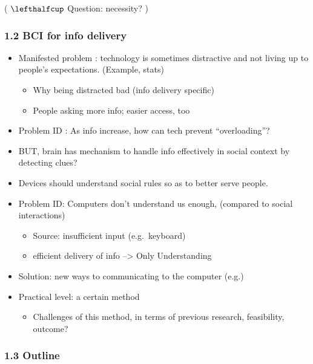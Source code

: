 \documentclass[11pt]{article}
\begin{document}
( $\lefthalfcup$ Question: necessity? )

\subsubsection{1.2 BCI for info delivery}\label{bci-for-info-delivery}

\begin{itemize}
\itemsep1pt\parskip0pt
\item
  Manifested problem : technology is sometimes distractive and not
  living up to people's expectations. (Example, stats)

  \begin{itemize}
  \itemsep1pt\parskip0pt
  \item
    Why being distracted bad (info delivery specific)
  \item
    People asking more info; easier access, too
  \end{itemize}
\item
  Problem ID : As info increase, how can tech prevent ``overloading''?
\item
  BUT, brain has mechanism to handle info effectively in social context
  by detecting clues?
\item
  Devices should understand social rules so as to better serve people.
\item
  Problem ID: Computers don't understand us enough, (compared to social
  interactions)

  \begin{itemize}
  \itemsep1pt\parskip0pt
  \item
    Source: insufficient input (e.g.~keyboard)
  \item
    efficient delivery of info --\textgreater{} Only Understanding
  \end{itemize}
\item
  Solution: new ways to communicating to the computer (e.g.)
\item
  Practical level: a certain method

  \begin{itemize}
  \itemsep1pt\parskip0pt
  \item
    Challenges of this method, in terms of previous research,
    feasibility, outcome?
  \end{itemize}
\end{itemize}

\subsubsection{1.3 Outline}\label{outline}
\end{document}
